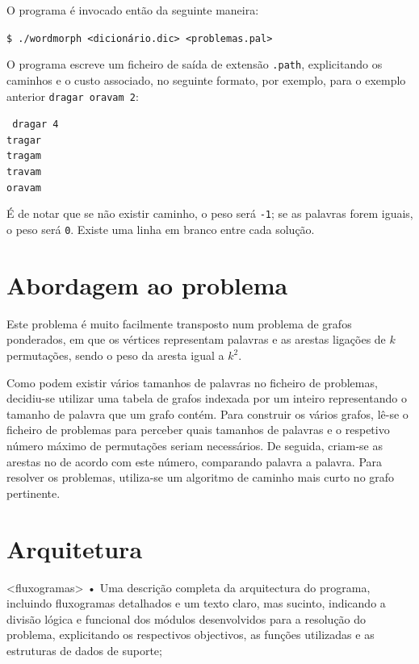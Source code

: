 \documentclass[a4paper, 18pt]{article}
\begin{document}
	\par
	O programa é invocado então da seguinte maneira:
	\begin{center}
		\texttt{\$ ./wordmorph <dicionário.dic> <problemas.pal>}
	\end{center}
	\par
	O programa escreve um ficheiro de saída de extensão \texttt{.path}, explicitando os caminhos e o custo associado, no seguinte formato, por exemplo, para o exemplo anterior \texttt{dragar oravam 2}:
	\begin{center}
		\texttt{
		dragar 4\\
		tragar \\
		tragam \\
		travam \\
		oravam}
	\end{center}
	\par
	É de notar que se não existir caminho, o peso será \texttt{-1}; se as palavras forem iguais, o peso será \texttt{0}. Existe uma linha em branco entre cada solução.


\section{Abordagem ao problema}
	\par
	Este problema é muito facilmente transposto num problema de grafos ponderados, em que os vértices representam palavras e as arestas ligações de $k$ permutações, sendo o peso da aresta igual a $k^2$.
	\par
	Como podem existir vários tamanhos de palavras no ficheiro de problemas, decidiu-se utilizar uma tabela de grafos indexada por um inteiro representando o tamanho de palavra que um grafo contém. Para construir os vários grafos, lê-se o ficheiro de problemas para perceber quais tamanhos de palavras e o respetivo número máximo de permutações seriam necessários. De seguida, criam-se as arestas no de acordo com este número, comparando palavra a palavra. Para resolver os problemas, utiliza-se um algoritmo de caminho mais curto no grafo pertinente.


\section{Arquitetura}
	<fluxogramas>
• Uma descrição completa da arquitectura do programa, incluindo fluxogramas
detalhados e um texto claro, mas sucinto, indicando a divisão lógica e funcional dos
módulos desenvolvidos para a resolução do problema, explicitando os respectivos
objectivos, as funções utilizadas e as estruturas de dados de suporte;
\end{document}
